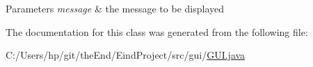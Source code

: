 \begin{DoxyParams}{Parameters}
{\em message} & the message to be displayed \\
\hline
\end{DoxyParams}


The documentation for this class was generated from the following file\-:\begin{DoxyCompactItemize}
\item 
C\-:/\-Users/hp/git/the\-End/\-Eind\-Project/src/gui/\hyperlink{_g_u_i_8java}{G\-U\-I.\-java}\end{DoxyCompactItemize}
